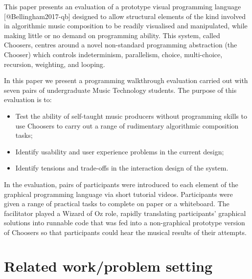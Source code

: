 \documentclass[]{article}
\providecommand{\tightlist}{%
  \setlength{\itemsep}{0pt}\setlength{\parskip}{0pt}}
\begin{document}
This paper presents an evaluation of a prototype visual programming
language {[}@Bellingham2017-qb{]} designed to allow structural elements
of the kind involved in algorithmic music composition to be readily
visualised and manipulated, while making little or no demand on
programming ability. This system, called Choosers, centres around a
novel non-standard programming abstraction (the Chooser) which controls
indeterminism, parallelism, choice, multi-choice, recursion, weighting,
and looping.

In this paper we present a programming walkthrough evaluation carried
out with seven pairs of undergraduate Music Technology students. The
purpose of this evaluation is to:

\begin{itemize}
\tightlist
\item
  Test the ability of self-taught music producers without programming
  skills to use Choosers to carry out a range of rudimentary algorithmic
  composition tasks;
\item
  Identify usability and user experience problems in the current design;
\item
  Identify tensions and trade-offs in the interaction design of the
  system.
\end{itemize}

In the evaluation, pairs of participants were introduced to each element
of the graphical programming language via short tutorial videos.
Participants were given a range of practical tasks to complete on paper
or a whiteboard. The facilitator played a Wizard of Oz role, rapidly
translating participants' graphical solutions into runnable code that
was fed into a non-graphical prototype version of Choosers so that
participants could hear the musical results of their attempts.

\hypertarget{related-workproblem-setting}{%
\section{Related work/problem
setting}\label{related-workproblem-setting}}
\end{document}
